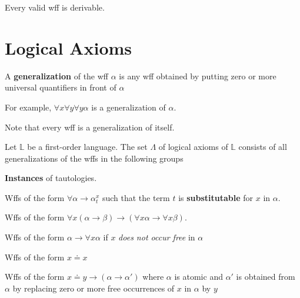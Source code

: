 \begin{theorem}[Completeness]
    \label{thm:FOCompleteness}
    Every valid wff is derivable.
\end{theorem}

\section{Logical Axioms}

\begin{definition}[Generalization]
    A \textbf{generalization} of the wff $\alpha$ is any wff obtained by putting zero or more universal quantifiers in front of $\alpha$
\end{definition}

For example, $\forall x\forall y\forall y\alpha$ is a generalization of $\alpha$.

Note that every wff is a generalization of itself.

\begin{definition}[Axioms]
    Let $\mathbb{L}$ be a first-order language. The set $\Lambda$ of logical axioms of $\mathbb{L}$ consists of all generalizations of the wffs in the following groups
    \begin{axiom}
        \label{axiom:InstanceOfTautology}
        \textbf{Instances} of tautologies.
    \end{axiom}
    \begin{axiom}
        \label{axiom:Substitution}
        Wffs of the form $\forall \alpha \to \alpha_t^x$ such that the term $t$ is \textbf{substitutable} for $x$ in $\alpha$.
    \end{axiom}
    \begin{axiom}
        \label{axiom:PushUniversalIntoImplication}
        Wffs of the form $\forall x(\alpha\to\beta) \to (\forall x \alpha\to \forall x \beta)$.
    \end{axiom}
    \begin{axiom}
        \label{axiom:QuantifyBoundedVar}
        Wffs of the form $\alpha\to\forall x \alpha$ if $x$ \emph{does not occur free} in $\alpha$
    \end{axiom}
    \begin{axiom}
        \label{axiom:Equality}
        Wffs of the form $x \doteq x$
    \end{axiom}
    \begin{axiom}
        \label{axiom:EqualitySubstitution}
        Wffs of the form $x \doteq y \to (\alpha \to \alpha')$ where $\alpha$ is atomic and $\alpha'$ is obtained from $\alpha$ by replacing zero or more free occurrences of $x$ in $\alpha$ by $y$
    \end{axiom}
\end{definition}

